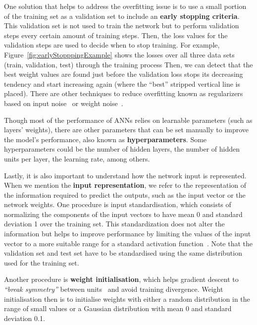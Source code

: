 One solution that helps to address the overfitting issue is to use a small portion of the 
training set as a validation set to include an \textbf{early stopping criteria}. This 
validation set is not used to train the network but to perform validation steps every certain 
amount of training steps. Then, the loss values for the validation steps are used to decide 
when to stop training. For example, Figure~\ref{fig:earlyStopppingExample} shows the losses 
over all three data sets (train, validation, test) through the training process Then, we can 
detect that the best weight values are found just before the validation loss stops its 
decreasing tendency and start increasing again (where the “best” stripped vertical line is 
placed). There are other techniques to reduce overfitting known as regularizers based on 
input noise~\cite{appendix:an1996effects, appendix:koistinen1991kernel, appendix:bishop1995neural} 
or weight noise~\cite{appendix:murray1994enhanced,appendix:jim1996analysis}.

Though most of the performance of ANNs relies on learnable parameters (such as layers’ weights), 
there are other parameters that can be set manually to improve the model’s performance, also 
known as \textbf{hyperparameters}. Some hyperparameters could be the number of hidden layers, 
the number of hidden units per layer, the learning rate, among others.

Lastly, it is also important to understand how the network input is represented. When we 
mention the \textbf{input representation}, we refer to the representation of the information 
required to predict the outputs, such as the input vector or the network weights. One 
procedure is input standardisation, which consists of normalizing the components of the input 
vectors to have mean 0 and standard deviation 1 over the training set. This standardization 
does not alter the information but helps to improve performance by limiting the values of the 
input vector to a more suitable range for a standard activation function~\cite{appendix:lecun1998efficient}. 
Note that the validation set and test set have to be standardised using the same distribution 
used for the training set. 

Another procedure is \textbf{weight initialisation}, which helps gradient descent to 
\textit{“break symmetry”} between units~\cite{appendix:lecun1998efficient} and avoid training 
divergence. Weight initialisation then is to initialise weights with either a random 
distribution in the range of small values or a Gaussian distribution with mean 0 and 
standard deviation 0.1.

